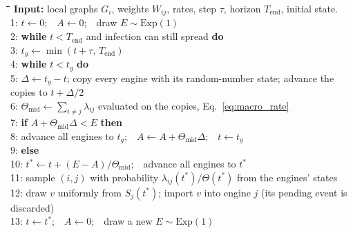 \documentclass[a4paper,fleqn]{cas-sc}
\newcommand{\Exp}{\mathrm{Exp}}
\begin{document}
\begin{algorithm}[tbp]
\caption{Grid-synchronised two-scale simulation of one realisation.}
\label{alg:scheduler}
\small
\begin{tabbing}
\hspace*{1.6em}\=\hspace*{1.4em}\=\hspace*{1.4em}\=\hspace*{1.4em}\=\kill
\textbf{Input:} local graphs $G_i$, weights $W_{ij}$, rates, step $\tau$, horizon $T_{\mathrm{end}}$, initial state.\\[2pt]
1:\> $t\gets 0$;\ \ $A\gets 0$;\ \ draw $E\sim\Exp(1)$\\
2:\> \textbf{while} $t<T_{\mathrm{end}}$ and infection can still spread \textbf{do}\\
3:\>\> $t_g\gets\min(t+\tau,\,T_{\mathrm{end}})$\\
4:\>\> \textbf{while} $t<t_g$ \textbf{do}\\
5:\>\>\> $\Delta\gets t_g-t$; copy every engine with its random-number state; advance the copies to $t+\Delta/2$\\
6:\>\>\> $\Theta_{\mathrm{mid}}\gets\sum_{i\neq j}\lambda_{ij}$ evaluated on the copies, Eq.~\eqref{eq:macro_rate}\\
7:\>\>\> \textbf{if} $A+\Theta_{\mathrm{mid}}\Delta<E$ \textbf{then} \\
8:\>\>\>\> advance all engines to $t_g$;\ \ $A\gets A+\Theta_{\mathrm{mid}}\Delta$;\ \ $t\gets t_g$\\
9:\>\>\> \textbf{else}\\
10:\>\>\>\> $t^\ast\gets t+(E-A)/\Theta_{\mathrm{mid}}$;\ \ advance all engines to $t^\ast$\\
11:\>\>\>\> sample $(i,j)$ with probability $\lambda_{ij}(t^\ast)/\Theta(t^\ast)$ from the engines' states\\
12:\>\>\>\> draw $v$ uniformly from $S_j(t^\ast)$; import $v$ into engine $j$ (its pending event is discarded)\\
13:\>\>\>\> $t\gets t^\ast$;\ \ $A\gets 0$;\ \ draw a new $E\sim\Exp(1)$
\end{tabbing}
\end{algorithm}
\end{document}
